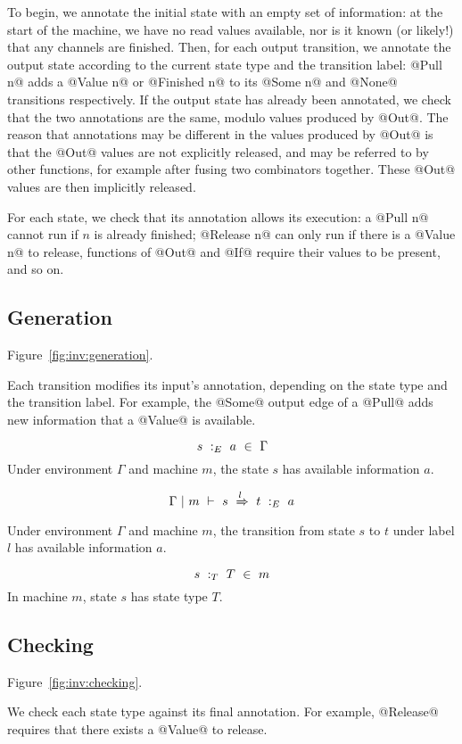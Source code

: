 To begin, we annotate the initial state with an empty set of information: at the start of the machine, we have no read values available, nor is it known (or likely!) that any channels are finished.
Then, for each output transition, we annotate the output state according to the current state type and the transition label: @Pull n@ adds a @Value n@ or @Finished n@ to its @Some n@ and @None@ transitions respectively.
If the output state has already been annotated, we check that the two annotations are the same, modulo values produced by @Out@.
The reason that annotations may be different in the values produced by @Out@ is that the @Out@ values are not explicitly released, and may be referred to by other functions, for example after fusing two combinators together.
These @Out@ values are then implicitly released.

For each state, we check that its annotation allows its execution: a @Pull n@ cannot run if $n$ is already finished; @Release n@ can only run if there is a @Value n@ to release, functions of @Out@ and @If@ require their values to be present, and so on.



\subsection{Generation}
Figure~\ref{fig:inv:generation}.

Each transition modifies its input's annotation, depending on the state type and the transition label.
For example, the @Some@ output edge of a @Pull@ adds new information that a @Value@ is available.

$$ s~:_E~ a ~\in~ \Gamma $$
Under environment $\Gamma$ and machine $m$, the state $s$ has available information $a$.

$$ \Gamma ~|~ m ~\vdash~ s~\xRightarrow{l}~t ~:_E~ a $$
Under environment $\Gamma$ and machine $m$, the transition from state $s$ to $t$ under label $l$ has available information $a$.

$$ s ~:_T~ T ~\in~m $$
In machine $m$, state $s$ has state type $T$.


\subsection{Checking}
Figure~\ref{fig:inv:checking}.

We check each state type against its final annotation. For example, @Release@ requires that there exists a @Value@ to release.

